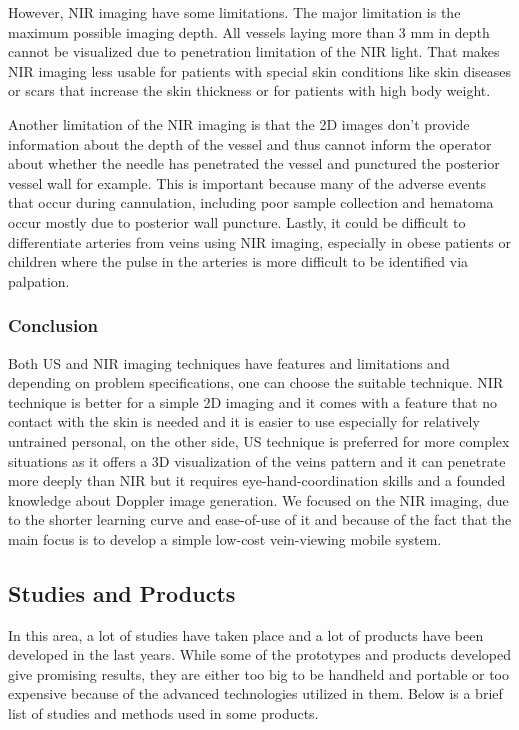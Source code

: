 However, NIR imaging have some limitations. The major limitation is the maximum possible imaging depth. All vessels laying more than 3 mm in depth cannot be visualized due to penetration limitation of the NIR light. That makes NIR imaging less usable for patients with special skin conditions like skin diseases or scars that increase the skin thickness or for patients with high body weight.

Another limitation of the NIR imaging is that the 2D images don’t provide information about the depth of the vessel and thus cannot inform the operator about whether the needle has penetrated the vessel and punctured the posterior vessel wall for example. This is important because many of the adverse events that occur during cannulation, including poor sample collection and hematoma occur mostly due to posterior wall puncture.
Lastly, it could be difficult to differentiate arteries from veins using NIR imaging, especially in obese patients or children where the pulse in the arteries is more difficult to be identified via palpation. 

\subsubsection{Conclusion}
Both US and NIR imaging techniques have features and limitations and depending on problem specifications, one can choose the suitable technique. NIR technique is better for a simple 2D imaging and it comes with a feature that no contact with the skin is needed and it is easier to use especially for relatively untrained personal, on the other side, US technique is preferred for more complex situations as it offers a 3D visualization of the veins pattern and it can penetrate more deeply than NIR but it requires eye-hand-coordination skills and a founded knowledge about Doppler image generation. We focused on the NIR imaging, due to the shorter learning curve and ease-of-use of it and because of the fact that the main focus is to develop a simple low-cost vein-viewing mobile system.


\subsection{Studies and Products}

In this area, a lot of studies have taken place and a lot of products have been developed in the last years. While some of the prototypes and products developed give promising results, they are either too big to be handheld and portable or too expensive because of the advanced technologies utilized in them. Below is a brief list of studies and methods used in some products.

